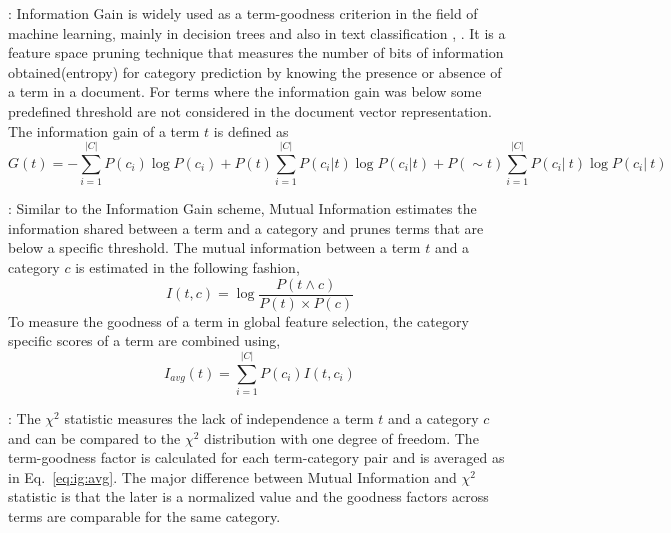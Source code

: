 : Information Gain is widely used as a term-goodness criterion in the field of machine learning, mainly in decision trees \citep{quinlan1986induction} and also in text classification \citep{lewis1994comparison}, \citep{moulinier1996text}. It is a feature space pruning technique that measures the number of bits of information obtained(entropy) for category prediction by knowing the presence or absence of a term in a document. For terms where the information gain was below some predefined threshold are not considered in the document vector representation.  The information gain of a term $t$ is defined as
\begin{equation}
G(t) = -\sum_{i=1}^{|C|} P(c_{i})\log P(c_{i}) + P(t)\sum_{i=1}^{|C|} P(c_{i}|t)\log P(c_{i}|t) + P(\sim t)\sum_{i=1}^{|C|} P(c_{i}|~t)\log P(c_{i}|~t)
\end{equation}

 : Similar to the Information Gain scheme, Mutual Information estimates the information shared between a term and a category and prunes terms that are below a specific threshold. The mutual information between a term $t$ and a category $c$ is estimated in the following fashion, 
\begin{equation}
I(t,c) = \log \frac{P(t \wedge c)}{P(t) \times P(c)}
\end{equation}
To measure the goodness of a term in global feature selection, the category specific scores of a term are combined using, 
\begin{equation}
\label{eq:ig:avg}
I_{avg}(t) = \sum_{i=1}^{|C|} P(c_{i})I(t,c_{i})
\end{equation}

 : The $\chi^{2}$ statistic measures the lack of independence a term $t$ and a category $c$ and can be compared to the $\chi^{2}$ distribution with one degree of freedom. The term-goodness factor is calculated for each term-category pair and is averaged as in Eq.~\ref{eq:ig:avg}. The major difference between Mutual Information and $\chi^{2}$ statistic is that the later is a normalized value and the goodness factors across terms are comparable for the same category.

